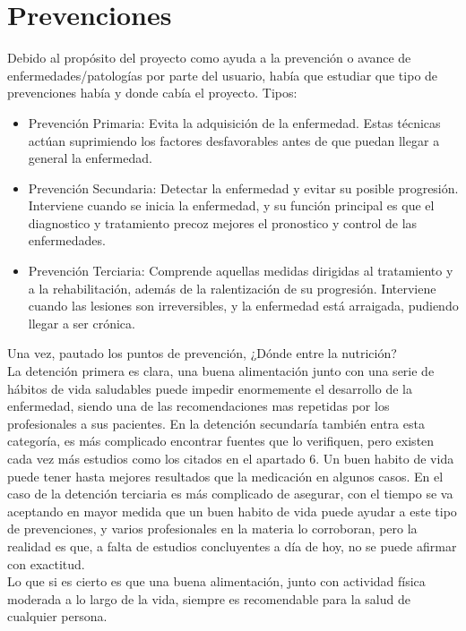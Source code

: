 \section{Prevenciones}
Debido al propósito del proyecto como ayuda a la prevención o avance de enfermedades/patologías por parte del usuario, había que estudiar que tipo de prevenciones había y donde cabía el proyecto.
Tipos:
\begin{itemize}
\item	Prevención Primaria: Evita la adquisición de la enfermedad. Estas técnicas actúan suprimiendo los factores desfavorables antes de que puedan llegar a general la enfermedad.
\item	Prevención Secundaria: Detectar la enfermedad y evitar su posible progresión. Interviene cuando se inicia la enfermedad, y su función principal es que el diagnostico y tratamiento precoz mejores el pronostico y control de las enfermedades.
\item	Prevención Terciaria: Comprende aquellas medidas dirigidas al tratamiento y a la rehabilitación, además de la ralentización de su progresión. Interviene cuando las lesiones son irreversibles, y la enfermedad está arraigada, pudiendo llegar a ser crónica.
\end{itemize}
\cite{prevencion}

Una vez, pautado los puntos de prevención, ¿Dónde entre la nutrición?\\
La detención primera es clara, una buena alimentación junto con una serie de hábitos de vida saludables puede impedir enormemente el desarrollo de la enfermedad, siendo una de las recomendaciones mas repetidas por los profesionales a sus pacientes.
En la detención secundaría también entra esta categoría, es más complicado encontrar fuentes que lo verifiquen, pero existen cada vez más estudios como los citados en el apartado 6. Un buen habito de vida puede tener hasta mejores resultados que la medicación en algunos casos.
En el caso de la detención terciaria es más complicado de asegurar, con el tiempo se va aceptando en mayor medida que un buen habito de vida puede ayudar a este tipo de prevenciones, y varios profesionales en la materia lo corroboran, pero la realidad es que, a falta de estudios concluyentes a día de hoy, no se puede afirmar con exactitud.\\

Lo que si es cierto es que una buena alimentación, junto con actividad física moderada a lo largo de la vida, siempre es recomendable para la salud de cualquier persona.\\
